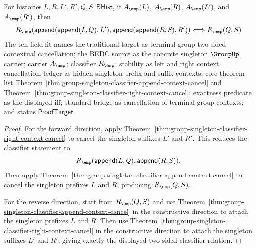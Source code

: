\begin{theorem}
\label{thm:group-singleton-classifier-two-sided-context-cancel}
For histories $L,R,L',R',Q,S:\mathsf{BHist}$, if $A_{\emp}(L)$,
$A_{\emp}(R)$, $A_{\emp}(L')$, and $A_{\emp}(R')$, then
$$
R_{\emp}(\mathsf{append}(\mathsf{append}(L,Q),L'),
\mathsf{append}(\mathsf{append}(R,S),R'))
\Longleftrightarrow
R_{\emp}(Q,S)
$$
The ten-field fit names the traditional target as terminal-group two-sided
contextual cancellation; the BEDC source as the concrete singleton $\GroupUp$
carrier; carrier $A_{\emp}$; classifier $R_{\emp}$; stability as left and
right context cancellation; ledger as hidden singleton prefix and suffix
contexts; core theorem list
Theorem~\ref{thm:group-singleton-classifier-append-context-cancel} and
Theorem~\ref{thm:group-singleton-classifier-right-context-cancel}; exactness
predicate as the displayed iff; standard bridge as cancellation of
terminal-group contexts; and status $\mathsf{ProofTarget}$.
\end{theorem}
\begin{proof}
For the forward direction, apply
Theorem~\ref{thm:group-singleton-classifier-right-context-cancel} to cancel
the singleton suffixes $L'$ and $R'$. This reduces the classifier statement
to
$$
R_{\emp}(\mathsf{append}(L,Q),\mathsf{append}(R,S)).
$$
Then apply Theorem~\ref{thm:group-singleton-classifier-append-context-cancel}
to cancel the singleton prefixes $L$ and $R$, producing $R_{\emp}(Q,S)$.

For the reverse direction, start from $R_{\emp}(Q,S)$ and use
Theorem~\ref{thm:group-singleton-classifier-append-context-cancel} in the
constructive direction to attach the singleton prefixes $L$ and $R$.
Then use Theorem~\ref{thm:group-singleton-classifier-right-context-cancel} in
the constructive direction to attach the singleton suffixes $L'$ and $R'$,
giving exactly the displayed two-sided classifier relation.
\end{proof}

